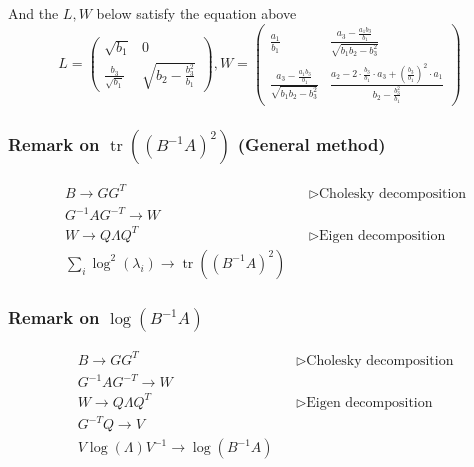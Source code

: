 \documentclass{article}
\theoremstyle{definition}
\theoremstyle{plain}
\begin{document}
And the $L,W$ below satisfy the equation above
\begin{equation*}
    L=
    \begin{pmatrix}
    \sqrt{b_1} & 0\\
    \frac{b_3}{\sqrt{b_1}} & \sqrt{b_2-\frac{b^2_3}{b_1}}
    \end{pmatrix},
    W=
    \begin{pmatrix}
    \frac{a_1}{b_1} & \frac{a_3-\frac{a_1b_3}{b_1}}{\sqrt{b_1b_2-b_3^2}}\\
    \frac{a_3-\frac{a_1b_3}{b_1}}{\sqrt{b_1b_2-b_3^2}} & \frac{a_2-2\cdot\frac{b_3}{b_1}\cdot a_3+\left(\frac{b_3}{b_1}\right)^2\cdot a_1}{b_2-\frac{b^2_3}{b_1}}
    \end{pmatrix}
\end{equation*}

\subsubsection{Remark on $\operatorname{tr}((B^{-1}A)^2)$ (General method)}
\begin{align*}
    &B\rightarrow GG^T&&\triangleright \text{Cholesky decomposition}\\
    &G^{-1}AG^{-T}\rightarrow W\\
    &W\rightarrow Q\Lambda Q^T&&\triangleright \text{Eigen decomposition}\\
    &\sum_i\log^2(\lambda_i)\rightarrow\operatorname{tr}((B^{-1}A)^2)
\end{align*}

\subsubsection{Remark on $\log(B^{-1}A)$}
\begin{align*}
    &B\rightarrow GG^T&&\triangleright \text{Cholesky decomposition}\\
    &G^{-1}AG^{-T}\rightarrow W\\
    &W\rightarrow Q\Lambda Q^T&&\triangleright \text{Eigen decomposition}\\
    &G^{-T}Q\rightarrow V\\
    &V\log(\Lambda)V^{-1}\rightarrow\log(B^{-1}A)
\end{align*}
\end{document}
